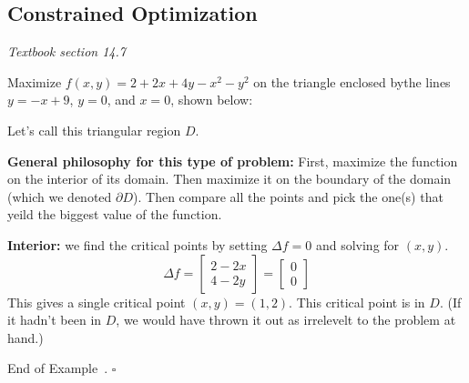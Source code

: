\documentclass[10pt]{article}
\theoremstyle{definition}
\newtheorem{example}[theorem]{Example}
\renewenvironment{example}
{\begin{oldexample}}
  {\par\smallskip\hfill   End of Example~\theexample. $\square$    \par\end{oldexample}}
\newcommand{\vt}{\vskip 5mm} %
\newcommand{\fl}{\noindent\textbf} %
\newcommand{\Fl}{\vt\noindent\textbf} %
\newcommand{\1}[1]{\textbf{1}_{\left[#1\right]}} %
\begin{document}
\subsection{Constrained Optimization}
\textit{Textbook section 14.7}



\begin{example}
  Maximize $f(x,y) = 2+2x+4y-x^{2}-y^{2}$  on the triangle enclosed bythe
  lines $y=-x+9$, $y=0$, and $x=0$, shown below:
  \begin{center}
  \end{center}
  Let's call this triangular region $D$.
  
  \Fl{General philosophy for this type of problem:} First, maximize the
  function on the interior of its domain. Then maximize it on the boundary of
  the domain (which we denoted $\partial D$). Then compare all the points and
  pick the one(s) that yeild the biggest value of the function.

  \fl{Interior:} we find the critical points by setting $\Delta f = 0$ and
  solving for $(x,y)$.
  \begin{equation*}
    \Delta f =
    \begin{bmatrix}
      2-2x\\4-2y
    \end{bmatrix}
    =
    \begin{bmatrix}
      0\\0
    \end{bmatrix}
  \end{equation*}
  This gives a single critical point $(x,y) = (1,2)$. This critical point is
  in $D$. (If it hadn't been in $D$, we would have thrown it out as irrelevelt
  to the problem at hand.)


\end{example}
\end{document}

